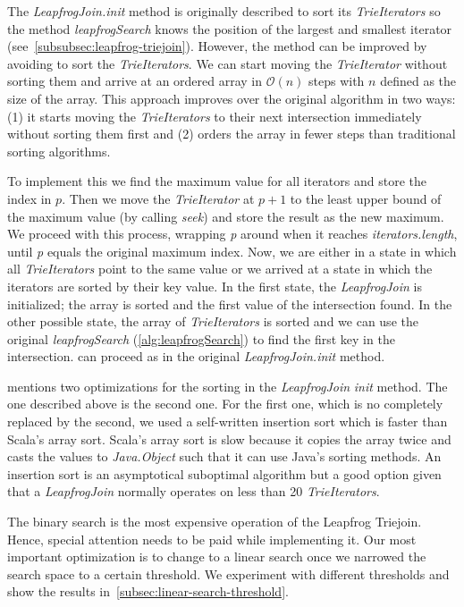 The \textit{LeapfrogJoin.init} method is originally described to sort its \textit{TrieIterators} so the method
\textit{leapfrogSearch} knows the position of the largest and smallest iterator (see~\cref{subsubsec:leapfrog-triejoin}).
However, the method can be improved by avoiding to sort the \textit{TrieIterators}.
We can start moving the \textit{TrieIterator} without sorting them and arrive at an ordered array in $\mathcal{O} (n)$ steps with $n$
defined as the size of the array.
This approach improves over the original algorithm in two ways: (1) it starts moving the \textit{TrieIterators} to their next intersection
immediately without sorting them first and
(2) orders the array in fewer steps than traditional sorting algorithms.

To implement this we find the maximum value for all iterators and store the index in $p$.
Then we move the \textit{TrieIterator} at $p + 1$ to the least upper bound of the maximum value (by calling \textit{seek}) and store the
result as the new maximum.
We proceed with this process, wrapping \textit{p} around when it reaches \textit{iterators.length}, until \textit{p} equals the original
maximum index.
Now, we are either in a state in which all \textit{TrieIterators} point to the same value or we arrived at a state in which the iterators
are sorted by their key value.
In the first state, the \textit{LeapfrogJoin} is initialized;
the array is sorted and the first value of the intersection found.
In the other possible state, the array of \textit{TrieIterators} is sorted and we can use the original \textit{leapfrogSearch}
(\cref{alg:leapfrogSearch}) to find the first key in the intersection.
can proceed as in the original \textit{LeapfrogJoin.init} method.

 mentions two optimizations for the sorting in the \textit{LeapfrogJoin} \textit{init} method.
The one described above is the second one.
For the first one, which is no completely replaced by the second, we used a self-written insertion sort which is faster than
Scala's array sort.
Scala's array sort is slow because it copies the array twice and casts the values to \textit{Java.Object} such that it can use Java's
sorting methods.
An insertion sort is an asymptotical suboptimal algorithm but a good option given that a \textit{LeapfrogJoin} normally operates on less
than 20 \textit{TrieIterators}.

The binary search is the most expensive operation of the Leapfrog Triejoin.
Hence, special attention needs to be paid while implementing it.
Our most important optimization is to change to a linear search once we narrowed the search space
to a certain threshold.
We experiment with different thresholds and show the results in~\cref{subsec:linear-search-threshold}.

